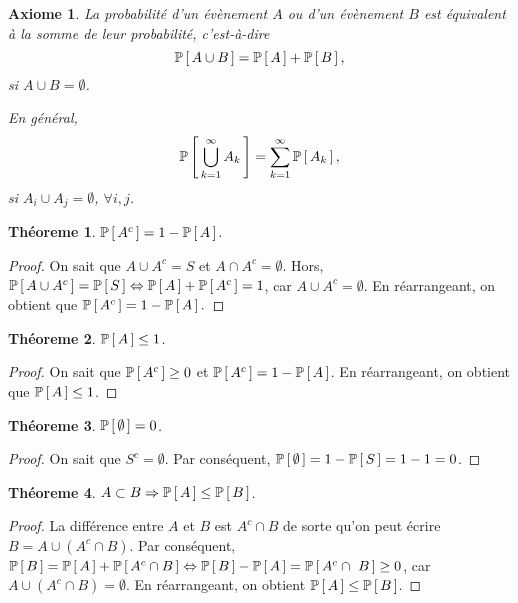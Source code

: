 \documentclass[11pt]{article}
\renewcommand\P[1]{%
	\ensuremath{%
		\mathbb{P}\left[\,#1\,\right]%
	}%
}%
\newtheorem{axiome}{Axiome}
\newtheorem{theoreme}{Théoreme}[section]
\begin{document}
\begin{axiome}
	La probabilité d'un évènement $A$ ou d'un évènement $B$ est équivalent à la
	somme de leur probabilité, c'est-à-dire
	\begin{equation*}
		\P{A\cup B}=\P{A}+\P{B},
	\end{equation*}
	si $A\cup B=\emptyset$.

	En général, 
	\begin{equation*}
		\P{\bigcup_{k=1}^\infty A_k}=\sum_{k=1}^\infty\P{A_k},
	\end{equation*}
	si $A_i\cup A_j=\emptyset$, $\forall i,j$.
\end{axiome}

\begin{theoreme}
	$\P{A^c}=1-\P{A}$.
\end{theoreme}

\begin{proof}
	On sait que $A\cup A^c=S$ et $A\cap A^c=\emptyset$. Hors,
	$\P{A\cup A^c}=\P{S}\Leftrightarrow\P{A}+\P{A^c}=1$, car
	$A\cup A^c=\emptyset$.
	En réarrangeant, on obtient que $\P{A^c}=1-\P{A}.$
\end{proof}

\begin{theoreme}
	$\P{A}\leq 1$.
\end{theoreme}

\begin{proof}
	On sait que $\P{A^c}\geq 0$ et $\P{A^c}=1-\P{A}$. En réarrangeant, on
	obtient que $\P{A}\leq 1$.
\end{proof}

\begin{theoreme}
	$\P{\emptyset}=0$.
\end{theoreme}

\begin{proof}
	On sait que $S^c=\emptyset$. Par conséquent, $\P{\emptyset}=1-\P{S}=1-1=0$.
\end{proof}

\begin{theoreme}
	$A\subset B\Rightarrow \P{A}\leq\P{B}$.
\end{theoreme}

\begin{proof}
	La différence entre $A$ et $B$ est $A^c\cap B$ de sorte qu'on peut écrire
	$B=A\cup(A^c\cap B)$. Par conséquent, $\P{B}=\P{A}+\P{A^c\cap B}
	\Leftrightarrow\P{B}-\P{A}=\P{A^c\cap B}\geq 0$, car
	$A\cup(A^c\cap B)=\emptyset$. En réarrangeant, on obtient $\P{A}\leq\P{B}$.
\end{proof}
\end{document}

